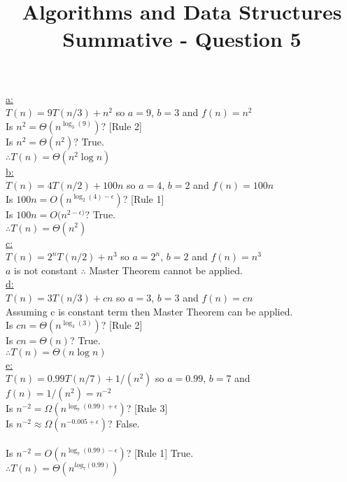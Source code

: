 \documentclass[10pt,a4paper]{article}
\title{Algorithms and Data Structures Summative - Question 5}
\begin{document}
	\underline{a:}\\
	$T(n) = 9T(n/3) + n^2$ so $a=9$, $b=3$ and $f(n) = n^2$\\
	Is $n^2 = \Theta(n^{\log_3(9)})$? [Rule 2]\\
	Is $n^2 = \Theta(n^{2})$? True.\\
	$\therefore T(n) = \Theta(n^2\log n)$\\
	
	\underline{b:}\\
	$T(n) = 4T(n/2) + 100n$ so $a=4$, $b=2$ and $f(n) = 100n$\\
	Is $100n = O(n^{\log_2(4) - \epsilon})$? [Rule 1]\\
	Is $100n = O(n^{2 - \epsilon)}$? True.\\
	$\therefore T(n) = \Theta(n^2)$\\
	
	\underline{c:}\\
	$T(n) = 2^nT(n/2) + n^3$ so $a=2^n$, $b=2$ and $f(n) = n^3$\\
	$a$ is not constant $\therefore$ Master Theorem cannot be applied.\\
	
	\underline{d:}\\
	$T(n) = 3T(n/3) + cn$ so $a=3$, $b=3$ and $f(n) = cn$\\
	Assuming c is constant term then Master Theorem can be applied.\\
	Is $cn = \Theta(n^{\log_3(3)})$? [Rule 2]\\
	Is $cn = \Theta(n)$? True.\\
	$\therefore T(n) = \Theta(n\log n)$\\
	
	\underline{e:}\\
	$T(n) = 0.99T(n/7) + 1/(n^2)$ so $a=0.99$, $b=7$ and $f(n) = 1/(n^2) = n^{-2}$\\
	Is $n^{-2} = \Omega(n^{\log_7(0.99) + \epsilon})$? [Rule 3]\\
	Is $n^{-2} \approx \Omega(n^{-0.005 + \epsilon})$? False.\\
	\\
	Is $n^{-2} = O(n^{\log_7(0.99) - \epsilon})$? [Rule 1] True.\\
	$\therefore T(n) = \Theta(n^{log_7(0.99)})$
\end{document}
